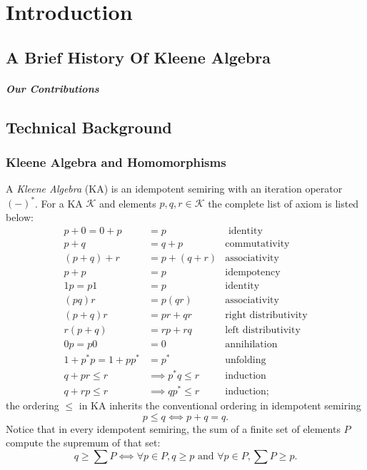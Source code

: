 \chapter{Introduction}
\label{chapter:introduction}
\thispagestyle{myheadings}

\section{A Brief History Of Kleene Algebra}
\label{sec:history}


\paragraph{Our Contributions}

\section{Technical Background}

\subsection{Kleene Algebra and Homomorphisms}

A \emph{Kleene Algebra} (KA) is an idempotent semiring with an iteration operator \((-)^*\).
For a KA \(𝒦\) and elements \(p, q, r ∈ 𝒦\) the complete list of axiom is listed below:
\begin{align*}
  p + 0 = 0 + p & = p & \text{ identity} \\
  p + q &= q + p & \text{commutativity}\\
  (p + q) + r & = p + (q + r) & \text{associativity} \\
  p + p & = p & \text{idempotency} \\
  1 p = p 1 & = p & \text{identity} \\
  (p  q)  r & = p  (q  r) & \text{associativity}\\
  (p + q) r & = pr + qr & \text{right distributivity} \\
  r (p + q) & = rp + rq & \text{left distributivity} \\
  0 p = p 0 & = 0 & \text{annihilation} \\
  1 + p^* p = 1 + p p^* & = p^* 
  & \text{unfolding} \\
  q + pr ≤ r & ⟹ p^* q ≤ r & 
  \text{induction} \\
  q + rp ≤ r & ⟹ qp^* ≤ r & 
  \text{induction};
\end{align*} 
the ordering \(≤\) in KA inherits the conventional ordering in idempotent semiring
\[ p ≤ q ⟺ p + q = q.\]
Notice that in every idempotent semiring, 
the sum of a finite set of elements \(P\) compute the supremum of that set:
\[q ≥ ∑ P ⟺ ∀ p ∈ P, q ≥ p \text{ and } ∀ p ∈ P, ∑ P ≥ p.\]

